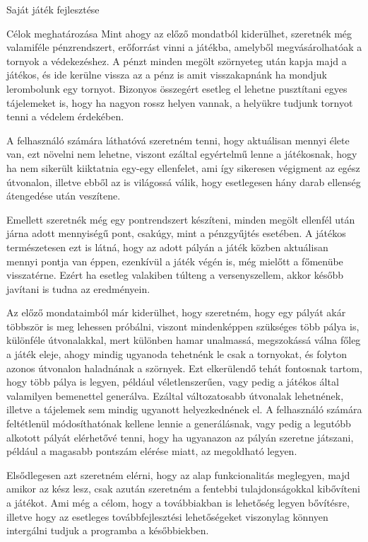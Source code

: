 \begin{MyChapter}{Saját játék fejlesztése}
\begin{MySection}{Célok meghatározása}
		Mint ahogy az előző mondatból kiderülhet, szeretnék még valamiféle pénzrendszert, erőforrást vinni a játékba, amelyből megvásárolhatóak a tornyok a védekezéshez. A pénzt minden megölt szörnyeteg után kapja majd a játékos, és ide kerülne vissza az a pénz is amit visszakapnánk ha mondjuk lerombolunk egy tornyot. Bizonyos összegért esetleg el lehetne pusztítani egyes tájelemeket is, hogy ha nagyon rossz helyen vannak, a helyükre tudjunk tornyot tenni a védelem érdekében.
		
		A felhasználó számára láthatóvá szeretném tenni, hogy aktuálisan mennyi élete van, ezt növelni nem lehetne, viszont ezáltal egyértelmű lenne a játékosnak, hogy ha nem sikerült kiiktatnia egy-egy ellenfelet, ami így sikeresen végigment az egész útvonalon, illetve ebből az is világossá válik, hogy esetlegesen hány darab ellenség átengedése után veszítene.
		
		Emellett szeretnék még egy pontrendszert készíteni, minden megölt ellenfél után járna adott mennyiségű pont, csakúgy, mint a pénzgyűjtés esetében. A játékos természetesen ezt is látná, hogy az adott pályán a játék közben aktuálisan mennyi pontja van éppen, ezenkívül a játék végén is, még mielőtt a főmenübe visszatérne. Ezért ha esetleg valakiben túlteng a versenyszellem, akkor később javítani is tudna az eredményein.
		
		Az előző mondataimból már kiderülhet, hogy szeretném, hogy egy pályát akár többször is meg lehessen próbálni, viszont mindenképpen szükséges több pálya is, különféle útvonalakkal, mert különben hamar unalmassá, megszokássá válna főleg a játék eleje, ahogy mindig ugyanoda tehetnénk le csak a tornyokat, és folyton azonos útvonalon haladnának a szörnyek. Ezt elkerülendő tehát fontosnak tartom, hogy több pálya is legyen, például véletlenszerűen, vagy pedig a játékos által valamilyen bemenettel generálva. Ezáltal változatosabb útvonalak lehetnének, illetve a tájelemek sem mindig ugyanott helyezkednének el. A felhasználó számára feltétlenül módosíthatónak kellene lennie a generálásnak, vagy pedig a legutóbb alkotott pályát elérhetővé tenni, hogy ha ugyanazon az pályán szeretne játszani, például a magasabb pontszám elérése miatt, az megoldható legyen.
		
		Elsődlegesen azt szeretném elérni, hogy az alap funkcionalitás meglegyen, majd amikor az kész lesz, csak azután szeretném a fentebbi tulajdonságokkal kibővíteni a játékot. Ami még a célom, hogy a továbbiakban is lehetőség legyen bővítésre, illetve hogy az esetleges továbbfejlesztési lehetőségeket viszonylag könnyen intergálni tudjuk a programba a későbbiekben.
	\end{MySection}
		

\end{MyChapter}
